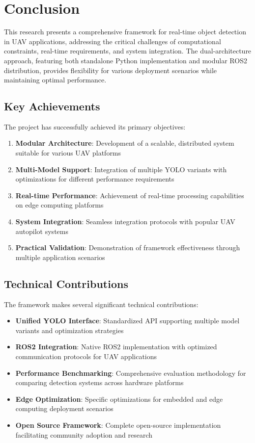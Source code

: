 \documentclass[12pt,a4paper]{article}
\begin{document}
\section{Conclusion}

This research presents a comprehensive framework for real-time object detection in UAV applications, addressing the critical challenges of computational constraints, real-time requirements, and system integration. The dual-architecture approach, featuring both standalone Python implementation and modular ROS2 distribution, provides flexibility for various deployment scenarios while maintaining optimal performance.

\subsection{Key Achievements}

The project has successfully achieved its primary objectives:

\begin{enumerate}
    \item \textbf{Modular Architecture}: Development of a scalable, distributed system suitable for various UAV platforms
    \item \textbf{Multi-Model Support}: Integration of multiple YOLO variants with optimizations for different performance requirements
    \item \textbf{Real-time Performance}: Achievement of real-time processing capabilities on edge computing platforms
    \item \textbf{System Integration}: Seamless integration protocols with popular UAV autopilot systems
    \item \textbf{Practical Validation}: Demonstration of framework effectiveness through multiple application scenarios
\end{enumerate}

\subsection{Technical Contributions}

The framework makes several significant technical contributions:

\begin{itemize}
    \item \textbf{Unified YOLO Interface}: Standardized API supporting multiple model variants and optimization strategies
    \item \textbf{ROS2 Integration}: Native ROS2 implementation with optimized communication protocols for UAV applications
    \item \textbf{Performance Benchmarking}: Comprehensive evaluation methodology for comparing detection systems across hardware platforms
    \item \textbf{Edge Optimization}: Specific optimizations for embedded and edge computing deployment scenarios
    \item \textbf{Open Source Framework}: Complete open-source implementation facilitating community adoption and research
\end{itemize}
\end{document}
